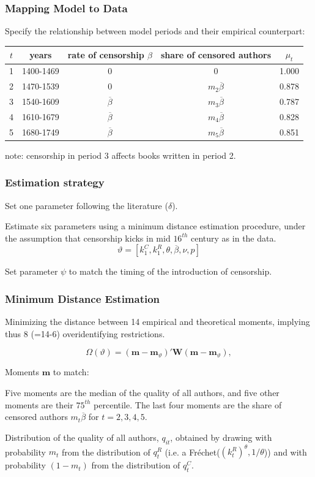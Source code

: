 \documentclass[usepdftitle=false,aspectratio=169,xcolor=dvipsnames]{beamer}
\begin{document}
	\begin{frame}
\frametitle{Mapping Model to Data}

Specify the relationship between model periods and their empirical counterpart:

\begin{tabular}{ccccc}
\hline\hline
$t$         &   years       & rate of censorship $\beta $  & share of censored authors & $\mu_t$ \\
\hline
1           & 1400-1469     & 0                            & 0                        & 1.000\\
2           & 1470-1539     & 0                            & $m_2\overline{\beta}$    &  0.878\\
3           & 1540-1609     & $\overline{\beta}$           & $m_3\overline{\beta}$    & 0.787\\
4           & 1610-1679     & $\overline{\beta}$           & $m_4\overline{\beta}$    & 0.828\\
5           & 1680-1749     & $\overline{\beta}$           & $m_5\overline{\beta}$    & 0.851\\
\hline\hline\end{tabular}

note: censorship in period 3 affects books written in period 2.
\end{frame}


	\begin{frame}
\frametitle{Estimation strategy}

Set one parameter following the literature ($\delta$).

Estimate six parameters using a minimum distance estimation procedure, under the assumption that censorship kicks in mid $16^{th}$ century as in the data.
$$\vartheta=[k^C_1,k^R_1,\theta,\overline{\beta},\nu,p]$$

 Set  parameter $\psi$ to match the timing of the introduction of censorship.

\end{frame}

	\begin{frame}
\frametitle{Minimum Distance Estimation}

 Minimizing the distance between 14 empirical and theoretical moments, implying thus 8 (=14-6) over\-identifying restrictions.

 \begin{equation}
\Omega(\vartheta)= (\mathbf{m}-\mathbf{m}_\vartheta)'\mathbf{W}(\mathbf{m}-\mathbf{m}_\vartheta),
\end{equation}

Moments $\mathbf{m}$ to match:

Five moments are the median of the quality of all authors, and five other moments are their  $75^{th}$ percentile. The last four moments are the share of censored authors $m_t \overline{\beta}$ for $t=2,3,4,5$.

Distribution of the quality of all authors, $q_{it}$, obtained by drawing with probability $m_t$ from the distribution of $q^R_t$ (i.e. a Fr\'echet($(k_t^R)^\theta,1/\theta$)) and with probability $(1-m_t)$  from the distribution of $q^C_t$.

\end{frame}
\end{document}
